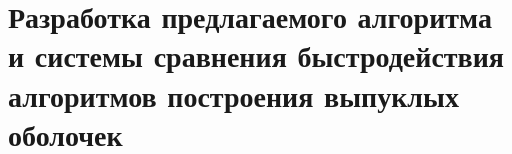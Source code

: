 \chapter{Разработка предлагаемого алгоритма и системы сравнения быстродействия алгоритмов построения выпуклых оболочек} \label{chapt3}

